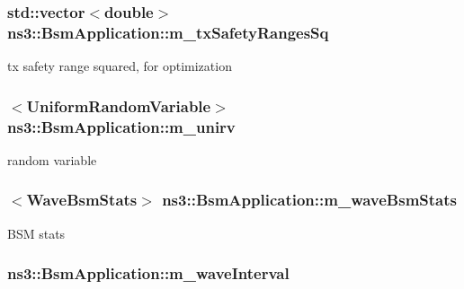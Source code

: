 \subsubsection[{\texorpdfstring{m\+\_\+tx\+Safety\+Ranges\+Sq}{m_txSafetyRangesSq}}]{\setlength{\rightskip}{0pt plus 5cm}std\+::vector$<$double$>$ ns3\+::\+Bsm\+Application\+::m\+\_\+tx\+Safety\+Ranges\+Sq\hspace{0.3cm}{\ttfamily [private]}}\hypertarget{classns3_1_1BsmApplication_a2e160b9460506f5d689f9a397504e13b}{}\label{classns3_1_1BsmApplication_a2e160b9460506f5d689f9a397504e13b}


tx safety range squared, for optimization 

\subsubsection[{\texorpdfstring{m\+\_\+unirv}{m_unirv}}]{$<${\bf Uniform\+Random\+Variable}$>$ ns3\+::\+Bsm\+Application\+::m\+\_\+unirv\hspace{0.3cm}{\ttfamily [private]}}\hypertarget{classns3_1_1BsmApplication_a8c6f7e06af51ef84b38358397b2d3cdc}{}\label{classns3_1_1BsmApplication_a8c6f7e06af51ef84b38358397b2d3cdc}


random variable 

\subsubsection[{\texorpdfstring{m\+\_\+wave\+Bsm\+Stats}{m_waveBsmStats}}]{$<${\bf Wave\+Bsm\+Stats}$>$ ns3\+::\+Bsm\+Application\+::m\+\_\+wave\+Bsm\+Stats\hspace{0.3cm}{\ttfamily [private]}}\hypertarget{classns3_1_1BsmApplication_afc424d5340ea34ee3099625627b8c036}{}\label{classns3_1_1BsmApplication_afc424d5340ea34ee3099625627b8c036}
B\+SM stats 
\subsubsection[{\texorpdfstring{m\+\_\+wave\+Interval}{m_waveInterval}}]{ ns3\+::\+Bsm\+Application\+::m\+\_\+wave\+Interval\hspace{0.3cm}{\ttfamily [private]}}\hypertarget{classns3_1_1BsmApplication_a99c61fbd55f10fd1e1e349739fadb178}{}\label{classns3_1_1BsmApplication_a99c61fbd55f10fd1e1e349739fadb178}


